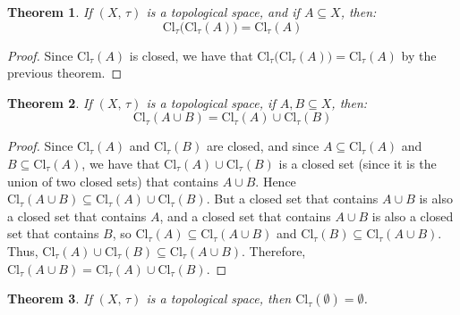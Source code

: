 \documentclass{article}
\theoremstyle{plain}
\newtheorem{theorem}{Theorem}[section]
\theoremstyle{normal}
\begin{document}
        \begin{theorem}
            If $(X,\,\tau)$ is a topological space, and if $A\subseteq{X}$,
            then:
            \begin{equation}
                \textrm{Cl}_{\tau}\big(\textrm{Cl}_{\tau}(A)\big)
                =\textrm{Cl}_{\tau}(A)
            \end{equation}
        \end{theorem}
        \begin{proof}
            Since $\textrm{Cl}_{\tau}(A)$ is closed, we have that
            $\textrm{Cl}_{\tau}\big(\textrm{Cl}_{\tau}(A)\big)=\textrm{Cl}_{\tau}(A)$
            by the previous theorem.
        \end{proof}
        \begin{theorem}
            If $(X,\,\tau)$ is a topological space, if
            $A,B\subseteq{X}$, then:
            \begin{equation}
                \textrm{Cl}_{\tau}(A\cup{B})
                =\textrm{Cl}_{\tau}(A)\cup\textrm{Cl}_{\tau}(B)
            \end{equation}
        \end{theorem}
        \begin{proof}
            Since $\textrm{Cl}_{\tau}(A)$ and $\textrm{Cl}_{\tau}(B)$ are
            closed, and since
            $A\subseteq\textrm{Cl}_{\tau}(A)$ and
            $B\subseteq\textrm{Cl}_{\tau}(A)$, we have that
            $\textrm{Cl}_{\tau}(A)\cup\textrm{Cl}_{\tau}(B)$ is a closed set
            (since it is the union of two closed sets) that contains
            $A\cup{B}$. Hence
            $\textrm{Cl}_{\tau}(A\cup{B})\subseteq\textrm{Cl}_{\tau}(A)\cup\textrm{Cl}_{\tau}(B)$.
            But a closed set that contains $A\cup{B}$ is also a closed set that
            contains $A$, and a closed set that contains $A\cup{B}$ is also a
            closed set that contains $B$, so
            $\textrm{Cl}_{\tau}(A)\subseteq\textrm{Cl}_{\tau}(A\cup{B})$ and
            $\textrm{Cl}_{\tau}(B)\subseteq\textrm{Cl}_{\tau}(A\cup{B})$. Thus,
            $\textrm{Cl}_{\tau}(A)\cup\textrm{Cl}_{\tau}(B)\subseteq\textrm{Cl}_{\tau}(A\cup{B})$.
            Therefore,
            $\textrm{Cl}_{\tau}(A\cup{B})=\textrm{Cl}_{\tau}(A)\cup\textrm{Cl}_{\tau}(B)$.
        \end{proof}
        \begin{theorem}
            If $(X,\,\tau)$ is a topological space, then
            $\textrm{Cl}_{\tau}(\emptyset)=\emptyset$.
        \end{theorem}
\end{document}
